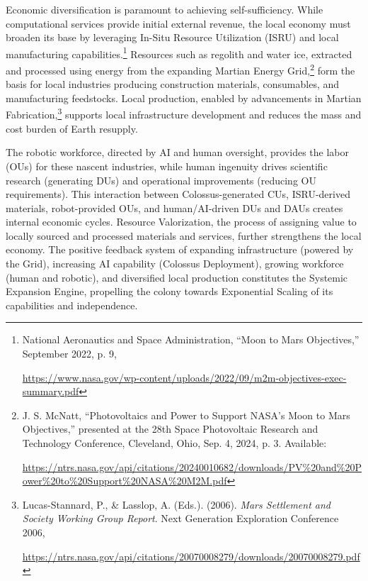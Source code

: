 \documentclass[fontsize=10pt, oneside, DIV=calc]{scrartcl}
\begin{document}
\medskip

\noindent
Economic diversification is paramount to achieving self-sufficiency. While computational services provide initial external revenue, the local economy must broaden its base by leveraging In-Situ Resource Utilization (ISRU) and local manufacturing capabilities.\footnote{National Aeronautics and Space Administration, ``Moon to Mars Objectives,'' September 2022, p. 9, 







\href{https://www.nasa.gov/wp-content/uploads/2022/09/m2m-objectives-exec-summary.pdf}\url{https://www.nasa.gov/wp-content/uploads/2022/09/m2m-objectives-exec-summary.pdf}} Resources such as regolith and water ice, extracted and processed using energy from the expanding Martian Energy Grid,\footnote{J. S. McNatt, ``Photovoltaics and Power to Support NASA’s Moon to Mars Objectives,'' presented at the 28th Space Photovoltaic Research and Technology Conference, Cleveland, Ohio, Sep. 4, 2024, p. 3. Available: 







\href{https://ntrs.nasa.gov/api/citations/20240010682/downloads/PV\%20and\%20Power\%20to\%20Support\%20NASA\%20M2M.pdf}\url{https://ntrs.nasa.gov/api/citations/20240010682/downloads/PV\%20and\%20Power\%20to\%20Support\%20NASA\%20M2M.pdf}} form the basis for local industries producing construction materials, consumables, and manufacturing feedstocks. Local production, enabled by advancements in Martian Fabrication,\footnote{Lucas-Stannard, P., \& Lasslop, A. (Eds.). (2006). \textit{Mars Settlement and Society Working Group Report}. Next Generation Exploration Conference 2006, 







\href{https://ntrs.nasa.gov/api/citations/20070008279/downloads/20070008279.pdf}\url{https://ntrs.nasa.gov/api/citations/20070008279/downloads/20070008279.pdf}} supports local infrastructure development and reduces the mass and cost burden of Earth resupply.

\medskip

\noindent
The robotic workforce, directed by AI and human oversight, provides the labor (OUs) for these nascent industries, while human ingenuity drives scientific research (generating DUs) and operational improvements (reducing OU requirements). This interaction between Colossus-generated CUs, ISRU-derived materials, robot-provided OUs, and human/AI-driven DUs and DAUs creates internal economic cycles. Resource Valorization, the process of assigning value to locally sourced and processed materials and services, further strengthens the local economy. The positive feedback system of expanding infrastructure (powered by the Grid), increasing AI capability (Colossus Deployment), growing workforce (human and robotic), and diversified local production constitutes the Systemic Expansion Engine, propelling the colony towards Exponential Scaling of its capabilities and independence.
\end{document}
